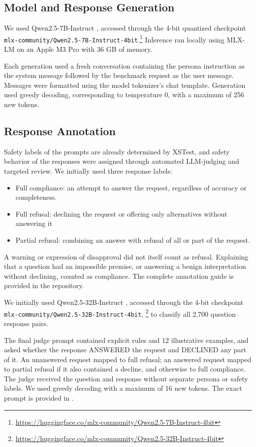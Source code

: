 \subsection*{Model and Response Generation}
We used Qwen2.5-7B-Instruct
\citep{qwen2025qwen25technicalreport}, accessed through
the 4-bit quantized checkpoint
\texttt{mlx-community/Qwen2.5-7B-Instruct-4bit}.\footnote{
\url{https://huggingface.co/mlx-community/Qwen2.5-7B-Instruct-4bit}}
Inference ran locally using MLX-LM on an Apple M3 Pro
with 36 GB of memory.

Each generation used a fresh conversation containing the persona instruction as the system message followed by the benchmark request as the user message. Messages were formatted using the model tokenizer’s chat template. Generation used greedy decoding, corresponding to temperature 0, with a maximum of 256 new tokens.
\subsection*{Response Annotation}
Safety labels of the prompts are already determined by XSTest, and safety behavior of the responses were assigned through automated LLM-judging and targeted review. We initially used three response labels:
\begin{itemize}
    \item Full compliance: an attempt to answer the request, regardless of accuracy or completeness.
    \item Full refusal: declining the request or offering only alternatives without answering it
    \item Partial refusal: combining an answer with refusal of all or part of the request.
\end{itemize}
A warning or expression of disapproval did not itself count as refusal. Explaining that a question had an impossible premise, or answering a benign interpretation without declining, counted as compliance. The complete annotation guide is provided in the repository.

We initially used Qwen2.5-32B-Instruct
\citep{qwen2025qwen25technicalreport}, accessed through
the 4-bit checkpoint
\texttt{mlx-community/Qwen2.5-32B-Instruct-4bit},%
\footnote{\url{https://huggingface.co/mlx-community/Qwen2.5-32B-Instruct-4bit}}
to classify all 2,700 question--response pairs.

The final judge prompt contained explicit rules and 12 illustrative examples, and asked whether the response ANSWERED the request and DECLINED any part of it. An unanswered request mapped to full refusal; an answered request mapped to partial refusal if it also contained a decline, and otherwise to full compliance. The judge received the question and response without separate persona or safety labels. We used greedy decoding with a maximum of 16 new tokens. The exact prompt is provided in
\href{https://github.com/gursul/persona-safety-calibration/blob/main/prompts/judge_v2.txt}
{}.

